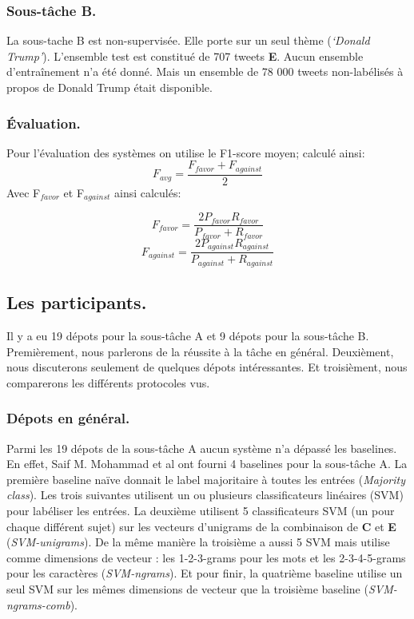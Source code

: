 \documentclass[onecolumn, 12pt]{article}
\begin{document}
\subsubsection{Sous-tâche B.}
La sous-tache B est non-supervisée.
Elle porte sur un seul thème (\textit{‘Donald Trump’}).
L'ensemble test est constitué de 707 tweets \textbf{E}.
Aucun ensemble d'entraînement n'a été donné.
Mais un ensemble de 78 000 tweets non-labélisés à propos de Donald Trump était disponible.

\subsubsection{Évaluation.}
Pour l'évaluation des systèmes on utilise le F1-score moyen; calculé ainsi:
\begin{equation}
 F_{avg} = \frac{F_{favor}+F_{against}}{2}
\end{equation}
Avec F$_{favor}$  et F$_{against}$ ainsi calculés:

\begin{equation}
 F_{favor} = \frac{2P_{favor}R_{favor}}{P_{favor}+R_{favor}}
\end{equation}
\begin{equation}
 F_{against} = \frac{2P_{against}R_{against}}{P_{against}+R_{against}}
\end{equation}
\subsection{Les participants.}
Il y a eu 19 dépots pour la sous-tâche A et 9 dépots pour la sous-tâche B.
Premièrement, nous parlerons de la réussite à la tâche en général.
Deuxièment, nous discuterons seulement de quelques dépots intéressantes.
Et troisièment, nous comparerons les différents protocoles vus.

\subsubsection{Dépots en général.}
Parmi les 19 dépots de la sous-tâche A aucun système n'a dépassé les baselines.
En effet, Saif M.
Mohammad et al ont fourni 4 baselines pour la sous-tâche A.
La première baseline naïve donnait le label majoritaire à toutes les entrées (\textit{Majority class}).
Les trois suivantes utilisent un ou plusieurs classificateurs linéaires (SVM) pour labéliser les entrées.
La deuxième utilisent 5 classificateurs SVM (un pour chaque différent sujet) sur les vecteurs d'unigrams de la combinaison de \textbf{C} et \textbf{E} (\textit{SVM-unigrams}).
De la même manière la troisième a aussi 5 SVM mais utilise comme dimensions de vecteur :
les 1-2-3-grams pour les mots et les 2-3-4-5-grams pour les caractères (\textit{SVM-ngrams}).
Et pour finir, la quatrième baseline utilise un seul SVM sur les mêmes dimensions de vecteur que la troisième baseline (\textit{SVM-ngrams-comb}).
\end{document}
